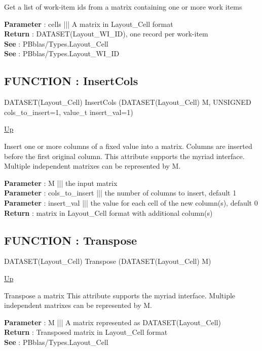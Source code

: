 \par
Get a list of work-item ids from a matrix containing one or more work items
\par
\textbf{Parameter} : cells ||| A matrix in Layout\_Cell format \\
\textbf{Return} : DATASET(Layout\_WI\_ID), one record per work-item \\
\textbf{See} : PBblas/Types.Layout\_Cell \\
\textbf{See} : PBblas/Types.Layout\_WI\_ID \\
\subsection*{FUNCTION : InsertCols}
\hypertarget{ecldoc:pbblas.matutils.insertcols}{}
\begin{minipage}[t]{\textwidth}
\begin{flushleft}
DATASET(Layout\_Cell) InsertCols (DATASET(Layout\_Cell) M, UNSIGNED cols\_to\_insert=1, value\_t insert\_val=1)
\end{flushleft}
\end{minipage}
\hyperlink{ecldoc:PBblas.MatUtils}{Up}

\par
Insert one or more columns of a fixed value into a matrix. Columns are inserted before the first original column. This attribute supports the myriad interface. Multiple independent matrixes can be represented by M.
\par
\textbf{Parameter} : M ||| the input matrix \\
\textbf{Parameter} : cols\_to\_insert ||| the number of columns to insert, default 1 \\
\textbf{Parameter} : insert\_val ||| the value for each cell of the new column(s), default 0 \\
\textbf{Return} : matrix in Layout\_Cell format with additional column(s) \\
\subsection*{FUNCTION : Transpose}
\hypertarget{ecldoc:pbblas.matutils.transpose}{}
\begin{minipage}[t]{\textwidth}
\begin{flushleft}
DATASET(Layout\_Cell) Transpose (DATASET(Layout\_Cell) M)
\end{flushleft}
\end{minipage}
\hyperlink{ecldoc:PBblas.MatUtils}{Up}

\par
Transpose a matrix This attribute supports the myriad interface. Multiple independent matrixes can be represented by M.
\par
\textbf{Parameter} : M ||| A matrix represented as DATASET(Layout\_Cell) \\
\textbf{Return} : Transposed matrix in Layout\_Cell format \\
\textbf{See} : PBblas/Types.Layout\_Cell \\

